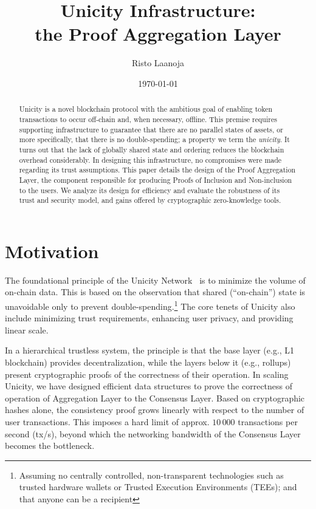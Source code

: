 \documentclass[twocolumn]{article}
\title{Unicity Infrastructure:\\
    the Proof Aggregation Layer}
\author[1]{Risto Laanoja}
\affil[1]{Unicity Labs}
\date{\today}
\begin{document}
\maketitle

\begin{abstract}
Unicity is a novel blockchain protocol with the ambitious goal of enabling token transactions to occur off-chain and, when necessary, offline. This premise requires supporting infrastructure to guarantee that there are no parallel states of assets, or more specifically, that there is no double-spending; a property we term the \textit{unicity}. It turns out that the lack of globally shared state and ordering reduces the blockchain overhead considerably. In designing this infrastructure, no compromises were made regarding its trust assumptions. This paper details the design of the Proof Aggregation Layer, the component responsible for producing Proofs of Inclusion and Non-inclusion to the users. We analyze its design for efficiency and evaluate the robustness of its trust and security model, and gains offered by cryptographic zero-knowledge tools.
\end{abstract}


\section{Motivation}

The foundational principle of the Unicity Network~\cite{wp} is to minimize the volume of on-chain data. This is based on the observation that shared (``on-chain'') state is unavoidable only to prevent double-spending.\footnote{Assuming no centrally controlled, non-transparent technologies such as trusted hardware wallets or Trusted Execution Environments (TEEs); and that anyone can be a recipient} The core tenets of Unicity also include minimizing trust requirements, enhancing user privacy, and providing linear scale.

In a hierarchical trustless system, the principle is that the base layer (e.g., L1 blockchain) provides decentralization, while the layers below it (e.g., rollups) present cryptographic proofs of the correctness of their operation. In scaling Unicity, we have designed efficient data structures to prove the correctness of operation of Aggregation Layer to the Consensus Layer. Based on cryptographic hashes alone, the consistency proof grows linearly with respect to the number of user transactions. This imposes a hard limit of approx. $10\,000$ transactions per second (tx/s), beyond which the networking bandwidth of the Consensus Layer becomes the bottleneck.
\end{document}
